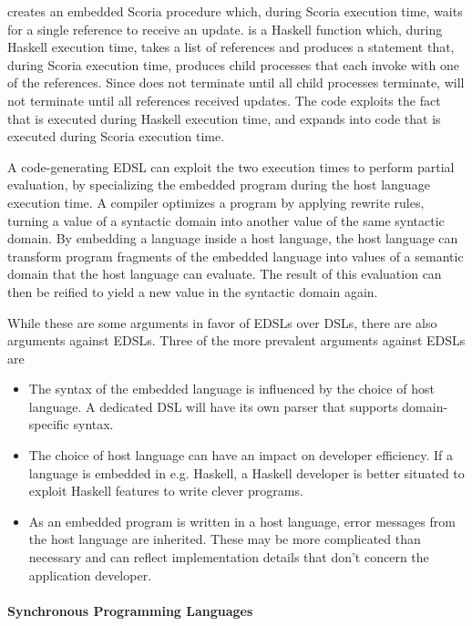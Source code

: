  creates an embedded Scoria procedure which, during Scoria execution time, waits for a
single reference to receive an update.  is a Haskell function which, during Haskell execution time, takes a list of
references and produces a  statement that, during Scoria execution time, produces child processes that each
invoke  with one of the references. Since  does not terminate until all child processes
terminate,  will not terminate until all references received updates. The code exploits the fact that
 is executed during Haskell execution time, and expands into code that is executed during Scoria execution time.

A code-generating EDSL can exploit the two execution times to perform partial evaluation\cite{DBLP:conf/haskell/ValliappanRL21},
by specializing the embedded program during the host language execution time. A compiler optimizes a program by applying
rewrite rules, turning a value of a syntactic domain into another value of the same syntactic domain.
By embedding a language inside a host language, the host language can transform program fragments of the embedded language
into values of a semantic domain that the host language can evaluate. The result of this evaluation can then be reified to
yield a new value in the syntactic domain again.

While these are some arguments in favor of EDSLs over DSLs, there are also arguments against EDSLs. Three of the more prevalent
arguments against EDSLs are

\begin{itemize}
    \item The syntax of the embedded language is influenced by the choice of host language. A dedicated DSL will have its own
    parser that supports domain-specific syntax.
    \item The choice of host language can have an impact on developer efficiency. If a language is embedded in e.g. Haskell, a
    Haskell developer is better situated to exploit Haskell features to write clever programs.
    \item As an embedded program is written in a host language, error messages from the host language are inherited. These may
    be more complicated than necessary and can reflect implementation details that don't concern the application developer.
\end{itemize}

\paragraph{Synchronous Programming Languages}

